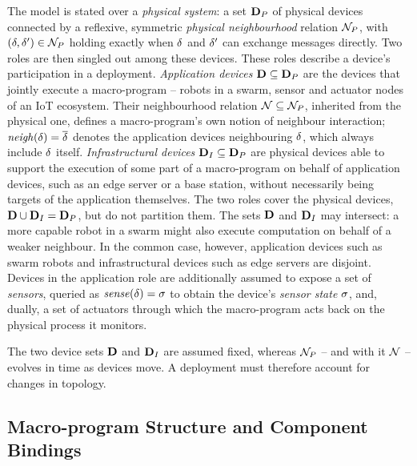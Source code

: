 The model is stated over a \emph{physical system}:
a set $\mathbf{D}_P$ of physical devices connected by a reflexive,
symmetric \emph{physical neighbourhood} relation $\mathcal{N}_P$,
with $(\delta,\delta') \in \mathcal{N}_P$ holding exactly when $\delta$ and $\delta'$ can exchange messages directly.
%
Two roles are then singled out among these devices.
These roles describe a device's participation in a deployment.
%
\emph{Application devices} $\mathbf{D} \subseteq \mathbf{D}_P$ are the devices that jointly execute a macro-program --
robots in a swarm,
sensor and actuator nodes of an \ac{IoT} ecosystem.
Their neighbourhood relation $\mathcal{N} \subseteq \mathcal{N}_P$,
inherited from the physical one,
defines a macro-program's own notion of neighbour interaction;
$\mathit{neigh}(\delta) = \overline{\delta}$ denotes the application devices neighbouring $\delta$,
which always include $\delta$ itself.
%
\emph{Infrastructural devices} $\mathbf{D}_{I} \subseteq \mathbf{D}_P$ are physical devices able to support the execution of some part of a macro-program on behalf of application devices,
such as an edge server or a base station,
without necessarily being targets of the application themselves.
%
The two roles cover the physical devices, $\mathbf{D} \cup \mathbf{D}_{I} = \mathbf{D}_P$, but do not partition them.
%
The sets $\mathbf{D}$ and $\mathbf{D}_{I}$ may intersect:
a more capable robot in a swarm might also execute computation on behalf of a weaker neighbour.
%
In the common case, however, application devices such as swarm robots and infrastructural devices such as edge servers are disjoint.
%
Devices in the application role are additionally assumed to expose a set of \emph{sensors},
queried as $\mathit{sense}(\delta) = \sigma$ to obtain the device's \emph{sensor state} $\sigma$,
and,
dually,
a set of actuators through which the macro-program acts back on the physical process it monitors.

The two device sets $\mathbf{D}$ and $\mathbf{D}_{I}$ are assumed fixed,
whereas $\mathcal{N}_P$ -- and with it $\mathcal{N}$ -- evolves in time as devices move.
A deployment must therefore account for changes in topology.

\subsection{Macro-program Structure and Component Bindings}
\label{subsec:macroprogram-dag}

